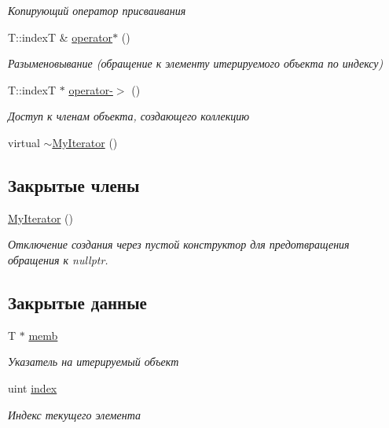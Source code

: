 \begin{DoxyCompactItemize}
\begin{DoxyCompactList}\small\item\em Копирующий оператор присваивания \end{DoxyCompactList}\item 
T\+::index\+T \& \hyperlink{class_network_service_1_1_my_iterator_ad6babde77410209a9972b5d2d5a29078}{operator$\ast$} ()
\begin{DoxyCompactList}\small\item\em Разыменовывание (обращение к элементу итерируемого объекта по индексу) \end{DoxyCompactList}\item 
T\+::index\+T $\ast$ \hyperlink{class_network_service_1_1_my_iterator_a425cc9c1dba308bb467d4d3122fb7457}{operator-\/$>$} ()
\begin{DoxyCompactList}\small\item\em Доступ к членам объекта, создающего коллекцию \end{DoxyCompactList}\item 
virtual \hyperlink{class_network_service_1_1_my_iterator_a2c2f5449fafddaf6f8a3557265f0d2d9}{$\sim$\+My\+Iterator} ()
\end{DoxyCompactItemize}
\subsection*{Закрытые члены}
\begin{DoxyCompactItemize}
\item 
\hyperlink{class_network_service_1_1_my_iterator_afdc20f191ceb30ab06cd7f10d4a6b699}{My\+Iterator} ()
\begin{DoxyCompactList}\small\item\em Отключение создания через пустой конструктор для предотвращения обращения к nullptr. \end{DoxyCompactList}\end{DoxyCompactItemize}
\subsection*{Закрытые данные}
\begin{DoxyCompactItemize}
\item 
T $\ast$ \hyperlink{class_network_service_1_1_my_iterator_a72858d4e9cc8cc8154f9e028ffa09aa7}{memb}
\begin{DoxyCompactList}\small\item\em Указатель на итерируемый объект \end{DoxyCompactList}\item 
uint \hyperlink{class_network_service_1_1_my_iterator_af3988a37b15d4fc081c55b2c21a93ad3}{index}
\begin{DoxyCompactList}\small\item\em Индекс текущего элемента \end{DoxyCompactList}\end{DoxyCompactItemize}
